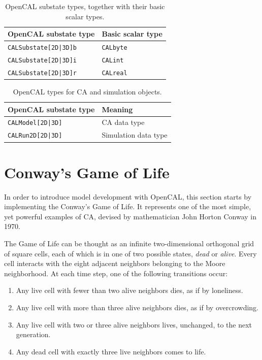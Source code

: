 \begin{table}
  \centering
  \begin{tabular}{l|l}
    \hline
    OpenCAL substate type & Basic scalar type \\
    \hline
    \verb'CALSubstate[2D|3D]b' & \verb'CALbyte'\\
    \verb'CALSubstate[2D|3D]i' & \verb'CALint' \\
    \verb'CALSubstate[2D|3D]r' & \verb'CALreal'\\
    \hline
  \end{tabular}
  \caption{OpenCAL substate types, together with their basic scalar
    types.}
  \label{tab:substate_types}
\end{table}

\begin{table}
  \centering
  \begin{tabular}{l|l}
    \hline
    OpenCAL substate type & Meaning \\
    \hline
    \verb'CALModel[2D|3D]' & CA data type\\
    \verb'CALRun2D[2D|3D]' & Simulation data type\\
    \hline
  \end{tabular}
  \caption{OpenCAL types for CA and simulation objects.}
  \label{tab:ca_sim_types}
\end{table}


\section{Conway's Game of Life}\label{sec:cal_life}

In order to introduce model development with OpenCAL, this section
starts by implementing the Conway's Game of Life. It represents one of
the most simple, yet powerful examples of CA, devised by mathematician
John Horton Conway in 1970.

The Game of Life can be thought as an infinite two-dimensional
orthogonal grid of square cells, each of which is in one of two
possible states, \emph{dead} or \emph{alive}. Every cell interacts
with the eight adjacent neighbors belonging to the Moore
neighborhood. At each time step, one of the following transitions
occur:

\begin{enumerate}
    \item Any live cell with fewer than two alive neighbors dies, as
      if by loneliness.
    \item Any live cell with more than three alive neighbors dies, as
      if by overcrowding.
    \item Any live cell with two or three alive neighbors lives,
      unchanged, to the next generation.
    \item Any dead cell with exactly three live neighbors comes to
      life.
\end{enumerate}

